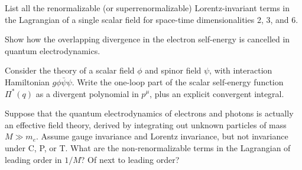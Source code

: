 
\begin{enumerate}
 List all the renormalizable (or superrenormalizable) Lorentz-invariant
terms in the Lagrangian of a single scalar field for space-time
dimensionalities 2, 3, and 6.

 Show how the overlapping divergence in the electron self-energy is
cancelled in quantum electrodynamics.

 Consider the theory of a scalar field $\phi$ and spinor field $\psi$,
with interaction Hamiltonian $g\phi\bar\psi\psi$. Write the one-loop part of
the scalar self-energy function $\Pi^*(q)$ as a divergent polynomial in
$p^\mu$, plus an explicit convergent integral.

 Suppose that the quantum electrodynamics of electrons and photons is
actually an effective field theory, derived by integrating out unknown
particles of mass $M\gg m_e$. Assume gauge invariance and Lorentz invariance,
but not invariance under C, P, or T. What are the non-renormalizable terms in
the Lagrangian of leading order in $1/M$? Of next to leading order?
\end{enumerate}
